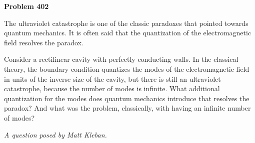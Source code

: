 \documentclass[12pt]{article}
\begin{document}
\begin{pottproblem}
\textbf{Problem 402}

The ultraviolet catastrophe is one of the classic paradoxes that
pointed towards quantum mechanics.  It is often said that the
quantization of the electromagnetic field resolves the paradox.

Consider a rectilinear cavity with perfectly conducting walls.  In the
classical theory, the boundary condition quantizes the modes of the
electromagnetic field in units of the inverse size of the cavity, but
there is still an ultraviolet catastrophe, because the number of modes
is infinite. What additional quantization for the modes does quantum
mechanics introduce that resolves the paradox? And what was the problem,
classically, with having an infinite number of modes?

{\normalsize\emph{A question posed by Matt Kleban.}}
\end{pottproblem}
\end{document}
